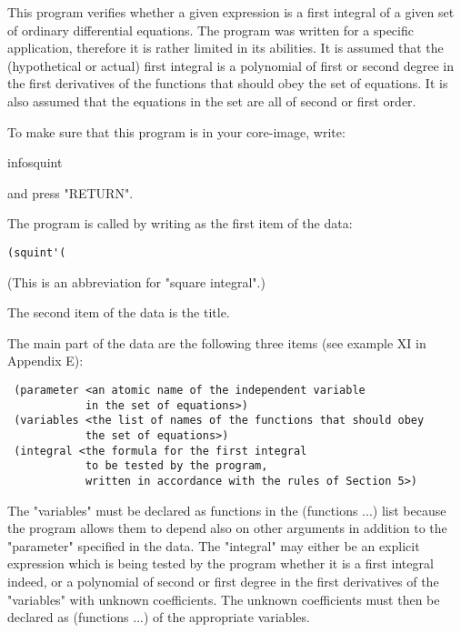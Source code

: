 This program verifies whether a given expression is a first integral of a given
set of ordinary differential equations. The program was written for a specific
application, therefore it is rather limited in its abilities. It is assumed
that the (hypothetical or actual) first integral is a polynomial of first or
second degree in the first derivatives of the functions that should obey the
set of equations. It is also assumed that the equations in the set are all of
second or first order.

To make sure that this program is in your core-image, write:

\bigskip

infosquint

\bigskip

\noindent and press "RETURN".

The program is called by writing as the first item of the data:

\bigskip

\begin{verbatim}
(squint'(
\end{verbatim}

\bigskip

\noindent (This is an abbreviation for "square integral".)

The second item of the data is the title.

The main part of the data are the following three items (see example XI in
Appendix E):

\bigskip

\begin{verbatim}
 (parameter <an atomic name of the independent variable
            in the set of equations>)
 (variables <the list of names of the functions that should obey
            the set of equations>)
 (integral <the formula for the first integral
            to be tested by the program,
            written in accordance with the rules of Section 5>)
\end{verbatim}

\bigskip

\noindent The "variables" must be declared as functions in the (functions ...)
list because the program allows them to depend also on other arguments in
addition to the "parameter" specified in the data. The "integral" may either be
an explicit expression which is being tested by the program whether it is a
first integral indeed, or a polynomial of second or first degree in the first
derivatives of the "variables" with unknown coefficients. The unknown
coefficients must then be declared as (functions ...) of the appropriate
variables.

